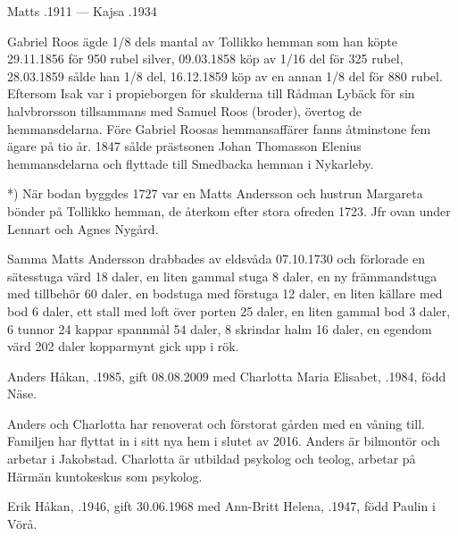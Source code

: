 Matts .1911  --- 	Kajsa .1934


Gabriel Roos ägde 1/8 dels mantal av Tollikko hemman som han köpte 29.11.1856 för 950 rubel silver, 09.03.1858 köp av 1/16 del för 325 rubel, 28.03.1859 sålde han 1/8 del, 16.12.1859 köp av en annan 1/8 del för 880 rubel. Eftersom Isak var i propieborgen för skulderna till Rådman Lybäck för sin halvbrorsson tillsammans med Samuel Roos (broder), övertog de hemmansdelarna. Före Gabriel Roosas hemmansaffärer fanns åtminstone fem ägare på tio år. 1847 sålde prästsonen Johan Thomasson Elenius hemmansdelarna och flyttade till Smedbacka hemman i Nykarleby.

*) När bodan byggdes 1727 var en Matts Andersson och hustrun Margareta bönder på Tollikko hemman, de återkom efter stora ofreden 1723. Jfr ovan under Lennart och Agnes Nygård.

Samma Matts Andersson drabbades av eldsvåda 07.10.1730 och förlorade en sätesstuga värd 18 daler, en liten gammal stuga 8 daler, en ny främmandstuga med tillbehör 60 daler, en bodstuga med förstuga 12 daler, en liten källare med bod 6 daler, ett stall med loft över porten 25 daler, en liten gammal bod 3 daler, 6 tunnor 24 kappar spannmål 54 daler, 8 skrindar halm 16 daler, en egendom värd 202 daler kopparmynt gick upp i rök.






Anders Håkan, .1985, gift 08.08.2009 med Charlotta Maria Elisabet, .1984, född Näse.
\begin{jhchildren}
  \item {}
  \item {}
\end{jhchildren}
Anders och Charlotta har renoverat och förstorat gården med en våning till. Familjen har flyttat in i sitt nya hem i slutet av 2016. Anders är bilmontör och arbetar i Jakobstad. Charlotta är utbildad psykolog och teolog, arbetar på Härmän kuntokeskus som psykolog.


Erik Håkan, .1946, gift 30.06.1968 med Ann-Britt Helena, .1947, född Paulin i Vörå.


